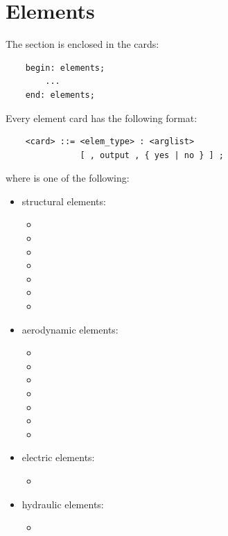 \chapter{Elements}\label{sec:ELEMENTS}
The  section is enclosed in the cards:
\begin{verbatim}
    begin: elements;
        ...
    end: elements;
\end{verbatim}
Every element card has the following format:
\begin{verbatim}
    <card> ::= <elem_type> : <arglist>
               [ , output , { yes | no } ] ;
\end{verbatim}
where  is one of the following:
\begin{itemize}
\item structural elements:
\begin{itemize}
\item {}
\item {}
\item {}
\item {}
\item {}
\item {}
\item {}
\end{itemize}

\item aerodynamic elements:
\begin{itemize}
\item {}
\item {}
\item {}
\item {}
\item {}
\item {}
\item {}
\end{itemize}

\item electric elements:
\begin{itemize}
\item {}
\end{itemize}

\item hydraulic elements:
\begin{itemize}
\item {}
\end{itemize}


\end{itemize}
